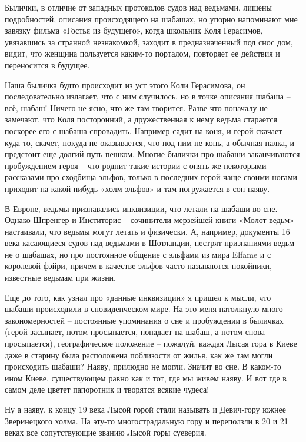 Былички, в отличие от западных протоколов судов над ведьмами, лишены подробностей, описания происходящего на шабашах, но упорно напоминают мне завязку фильма «Гостья из будущего», когда школьник Коля Герасимов, увязавшись за странной незнакомкой, заходит в предназначенный под снос дом, видит, что женщина пользуется каким-то порталом, повторяет ее действия и переносится в будущее.

Наша быличка будто происходит из уст этого Коли Герасимова, он последовательно излагает, что с ним случилось, но в точке описания шабаша – всё, шабаш! Ничего не ясно, что же там творится. Разве что поначалу не замечают, что Коля посторонний, а дружественная к нему ведьма старается поскорее его с шабаша спровадить. Например садит на коня, и герой скачает куда-то, скачет, покуда не оказывается, что под ним не конь, а обычная палка, и предстоит еще долгий путь пешком. Многие былички про шабаши заканчиваются пробуждением героя – что роднит такие истории с опять же некоторыми рассказами про сходбища эльфов, только в последних герой чаще своими ногами приходит на какой-нибудь «холм эльфов» и там погружается в сон наяву.

В Европе, ведьмы признавались инквизиции, что летали на шабаши во сне. Однако Шпренгер и Инститорис – сочинители мерзейшей книги «Молот ведьм» – настаивали, что ведьмы могут летать и физически. А, например, документы 16 века касающиеся судов над ведьмами в Шотландии, пестрят признаниями ведьм не о шабашах, но про постоянное общение с эльфами из мира Elfame и с королевой фэйри, причем в качестве эльфов часто называются покойники, известные ведьмам при жизни.

Еще до того, как узнал про «данные инквизиции» я пришел к мысли, что шабаши происходили в сновиденческом мире. На это меня натолкнуло много закономерностей – постоянные упоминания о сне и пробуждении в быличках (герой засыпает, потом просыпается, попадает на шабаш, а потом снова просыпается), географическое положение – пожалуй, каждая Лысая гора в Киеве даже в старину была расположена поблизости от жилья, как же там могли происходить шабаши? Наяву, прилюдно не могли. Значит во сне. В каком-то ином Киеве, существующем равно как и тот, где мы живем наяву. И вот где в самом деле цветет папоротник и творятся всякие чудеса!



Ну а наяву, к концу 19 века Лысой горой стали называть и Девич-гору южнее Зверинецкого холма. На эту-то многострадальную гору и переползли в 20 и 21 веках все сопутствующие званию Лысой горы суеверия.
